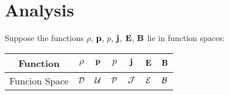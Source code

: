 \section{Analysis}

    Suppose the functions $\rho$, $\mathbf{p}$, $p$, $\mathbf{j}$, $\mathbf{E}$, $\mathbf{B}$ lie in function spaces: 
    \begin{center}\begin{tabular}{ c || c c c c c c }
        Function  &  $\rho$  &  $\mathbf{p}$  &  $p$  &  $\mathbf{j}$  &  $\mathbf{E}$  &  $\mathbf{B}$  \\
        \hline
        Funcion Space  &  $\mathcal{D}$  &  $\mathcal{U}$  &  $\mathcal{P}$  &  $\mathcal{J}$  &  $\mathcal{E}$  &  $\mathcal{B}$  \\
    \end{tabular}\end{center}


    
    
